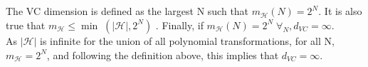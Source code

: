 \documentclass{scrartcl}
\begin{document}
\subsection{}

%
%
%

The VC dimension is defined as the largest N such that $m_\mathcal{H} (N) = 2^N.$
It is also true that $m_\mathcal{H} \leq \min \; (|\mathcal{H}|, 2^N)$
\cite[Home Assignment 5.2.1]{mla}. Finally, if $m_\mathcal{H} (N) = 2^N \; \forall_N, d_{VC} = \infty$. \cite[def. 2.5, p.50]{abu}\\

As $|\mathcal{H}|$ is infinite for the union of all polynomial transformations, for all N, $m_\mathcal{H} = 2^N$, and following the definition above, this implies that $d_{VC} = \infty$.

\subsection{}

\newpage
\printbibliography
\end{document}
